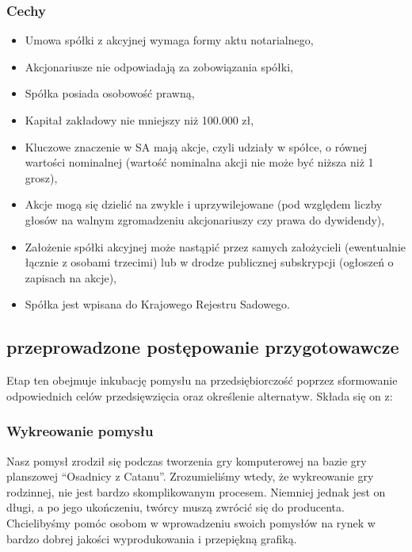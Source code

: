 \documentclass[a4paper, 11pt]{article}
\begin{document}
 \subsubsection{Cechy}%
\begin{itemize}
\item Umowa spółki z akcyjnej wymaga formy aktu notarialnego,
\item Akcjonariusze nie odpowiadają za zobowiązania spółki,
\item Spółka posiada osobowość prawną,
\item Kapitał zakładowy nie mniejszy niż 100.000 zł,
\item Kluczowe znaczenie w SA mają akcje, czyli udziały w spółce, o równej wartości nominalnej (wartość nominalna akcji nie może być niższa niż 1 grosz),
\item Akcje mogą się dzielić na zwykle i uprzywilejowane (pod względem liczby głosów na walnym zgromadzeniu akcjonariuszy czy prawa do dywidendy),
\item Założenie spółki akcyjnej może nastąpić przez samych założycieli (ewentualnie łącznie z osobami trzecimi) lub w drodze publicznej subskrypcji (ogłoszeń o zapisach na akcje),
\item Spółka jest wpisana do Krajowego Rejestru Sadowego.
\end{itemize}








	\subsection{przeprowadzone postępowanie przygotowawcze}
	\indent
	

	Etap ten obejmuje inkubację pomysłu na przedsiębiorczość poprzez sformowanie odpowiednich celów przedsięwzięcia oraz określenie alternatyw. Składa się on z:

	\subsubsection{Wykreowanie pomysłu}
	\indent
	
	Nasz pomysł zrodził się podczas tworzenia gry komputerowej na bazie gry planszowej “Osadnicy z Catanu”. Zrozumieliśmy wtedy, że wykreowanie gry rodzinnej, nie jest bardzo skomplikowanym procesem. Niemniej jednak jest on długi, a po jego ukończeniu, twórcy muszą zwrócić się do producenta. Chcielibyśmy pomóc osobom w wprowadzeniu swoich pomysłów na rynek w bardzo dobrej jakości wyprodukowania i przepiękną grafiką.
\end{document}
